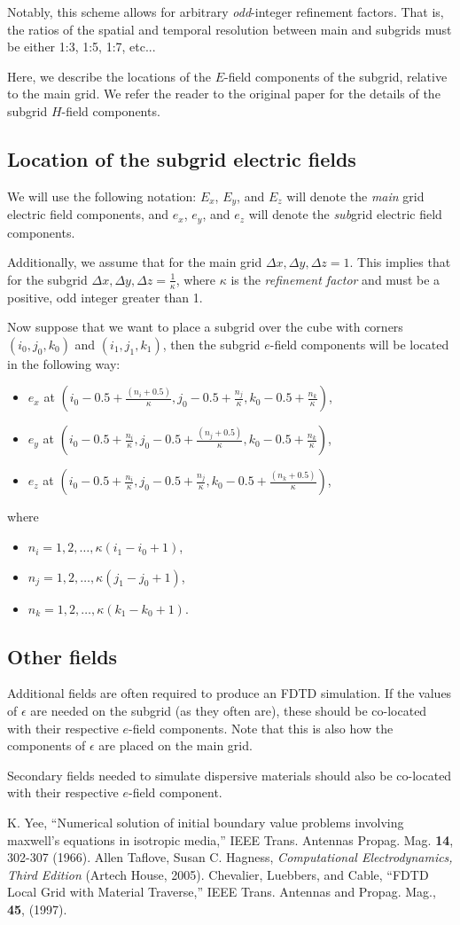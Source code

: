 \documentclass{article}
\newcommand{\inv}{\frac{1}}
\newcommand{\BI}{\begin{itemize}}
\newcommand{\I}{\item}
\newcommand{\EI}{\end{itemize}}
\begin{document}
Notably, this scheme allows for arbitrary \emph{odd}-integer refinement factors. That is, the ratios of the spatial and temporal resolution between main and subgrids must be either 1:3, 1:5, 1:7, etc...

Here, we describe the locations of the $E$-field components of the subgrid, relative to the main grid. We refer the reader to the original paper\cite{CLC} for the details of the subgrid $H$-field components.

\subsection{Location of the subgrid electric fields}
We will use the following notation: $E_x$, $E_y$, and $E_z$ will denote the \emph{main} grid electric field components, and $e_x$, $e_y$, and $e_z$ will denote the \emph{sub}grid electric field components.

Additionally, we assume that for the main grid $\Delta x, \Delta y, \Delta z = 1$. 
This implies that for the subgrid $\Delta x, \Delta y, \Delta z = \inv{\kappa}$, where $\kappa$ is the \emph{refinement factor} and must be a positive, odd integer greater than 1.

Now suppose that we want to place a subgrid over the cube with corners $(i_0, j_0, k_0)$ and $(i_1, j_1, k_1)$, then the subgrid $e$-field components will be located in the following way:
\BI
\I $e_x$ at 
    $(  i_0 - 0.5 + \frac{(n_i + 0.5)}{\kappa}, 
        j_0 - 0.5 + \frac{n_j}{\kappa}, 
        k_0 - 0.5 + \frac{n_k}{\kappa})$, 
\I $e_y$ at 
    $(  i_0 - 0.5 + \frac{n_i}{\kappa}, 
        j_0 - 0.5 + \frac{(n_j + 0.5)}{\kappa}, 
        k_0 - 0.5 + \frac{n_k}{\kappa})$, 
\I $e_z$ at 
    $(  i_0 - 0.5 + \frac{n_i}{\kappa}, 
        j_0 - 0.5 + \frac{n_j}{\kappa}, 
        k_0 - 0.5 + \frac{(n_k + 0.5)}{\kappa})$,
\EI
where
\BI
\I $n_i = 1, 2, \ldots, \kappa (i_1 - i_0 + 1)$,
\I $n_j = 1, 2, \ldots, \kappa (j_1 - j_0 + 1)$,
\I $n_k = 1, 2, \ldots, \kappa (k_1 - k_0 + 1)$.
\EI

\subsection{Other fields}
Additional fields are often required to produce an FDTD simulation. If the values of $\epsilon$ are needed on the subgrid (as they often are), these should be co-located with their respective $e$-field components.
Note that this is also how the components of $\epsilon$ are placed on the main grid.

Secondary fields needed to simulate dispersive materials should also be co-located with their respective $e$-field component.

\begin{thebibliography}{99}
 K. Yee, ``Numerical solution of initial boundary value problems involving maxwell's equations in isotropic media,'' IEEE Trans. Antennas Propag. Mag. \textbf{14}, 302-307 (1966).
 Allen Taflove, Susan C. Hagness, \emph{Computational Electrodynamics, Third Edition} (Artech House, 2005). 
 Chevalier, Luebbers, and Cable, ``FDTD Local Grid with Material Traverse,'' IEEE Trans. Antennas and Propag. Mag., \textbf{45}, (1997).
\end{thebibliography}
\end{document}

